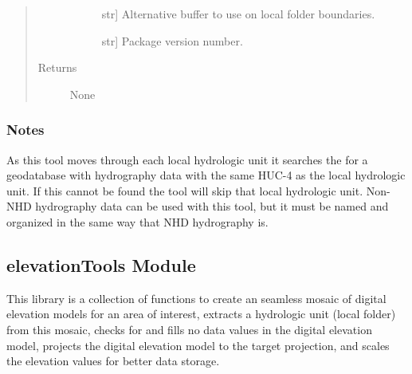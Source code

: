 \documentclass[letterpaper,10pt,english]{sphinxmanual}
\begin{document}
\begin{fulllineitems}
\begin{quote}
\begin{description}
\begin{description}
\item[{}] \leavevmode{[}str{]}
Alternative buffer to use on local folder boundaries.

\item[{}] \leavevmode{[}str{]}
Package version number.

\end{description}

\item[{Returns}] \leavevmode\begin{description}
\item[{None}] \leavevmode
\end{description}

\end{description}\end{quote}
\subsubsection*{Notes}

As this tool moves through each local hydrologic unit it searches the  for a geodatabase with hydrography data with the same HUC-4 as the local hydrologic unit. If this cannot be found the tool will skip that local hydrologic unit. Non-NHD hydrography data can be used with this tool, but it must be named and organized in the same way that NHD hydrography is.

\end{fulllineitems}



\subsection{elevationTools Module}
\label{\detokenize{elevationTools:module-elevationTools}}\label{\detokenize{elevationTools:elevationtools-module}}\label{\detokenize{elevationTools::doc}}
This library is a collection of functions to create an seamless mosaic of digital elevation models for an area of interest, extracts a hydrologic unit (local folder) from this mosaic, checks for and fills no data values in the digital elevation model, projects the digital elevation model to the target projection, and scales the elevation values for better data storage.
\end{document}
